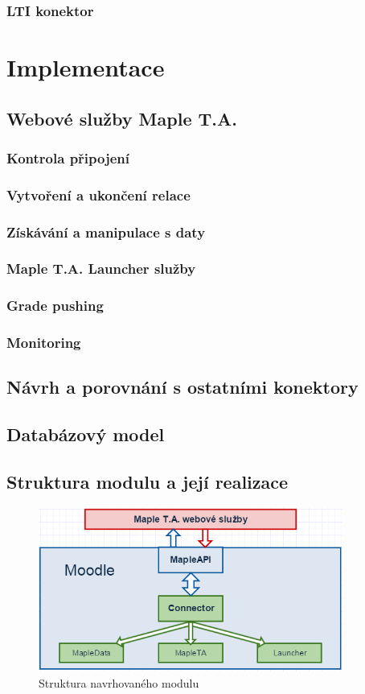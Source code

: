 \documentclass[
print,
  11pt,
  table,   
  nolof,    
  nolot,
  oneside,
  draft
]{fithesis3}
\begin{document}
		\subsection{LTI konektor}

\chapter{Implementace}
	\section{Webové služby Maple T.A.}
		\subsection{Kontrola připojení}
		\subsection{Vytvoření a ukončení relace}
		\subsection{Získávání a manipulace s daty}
		\subsection{Maple T.A. Launcher služby}
		\subsection{Grade pushing}
		\subsection{Monitoring}
	\section{Návrh a porovnání s ostatními konektory}
	\section{Databázový model}
	\section{Struktura modulu a její realizace}

		\begin{figure}
		  \begin{center}
		    \includegraphics[width=100mm]{images/struktura_modulu.png}
		   \end{center}
		  \caption{Struktura navrhovaného modulu}
		  \label{fig:strukturamodulu}
		\end{figure}
\end{document}
